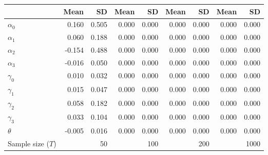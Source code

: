 
\begin{tabular}[t]{lrrrrrrrr}
\toprule
  & Mean & SD & Mean  & SD  & Mean   & SD   & Mean    & SD   \\
\midrule
$\alpha_{0}$ & 0.160 & 0.505 & 0.000 & 0.000 & 0.000 & 0.000 & 0.000 & 0.000\\
$\alpha_{1}$ & 0.060 & 0.188 & 0.000 & 0.000 & 0.000 & 0.000 & 0.000 & 0.000\\
$\alpha_{2}$ & -0.154 & 0.488 & 0.000 & 0.000 & 0.000 & 0.000 & 0.000 & 0.000\\
$\alpha_{3}$ & -0.016 & 0.050 & 0.000 & 0.000 & 0.000 & 0.000 & 0.000 & 0.000\\
$\gamma_{0}$ & 0.010 & 0.032 & 0.000 & 0.000 & 0.000 & 0.000 & 0.000 & 0.000\\
$\gamma_{1}$ & 0.015 & 0.047 & 0.000 & 0.000 & 0.000 & 0.000 & 0.000 & 0.000\\
$\gamma_{2}$ & 0.058 & 0.182 & 0.000 & 0.000 & 0.000 & 0.000 & 0.000 & 0.000\\
$\gamma_{3}$ & 0.033 & 0.104 & 0.000 & 0.000 & 0.000 & 0.000 & 0.000 & 0.000\\
$\theta$ & -0.005 & 0.016 & 0.000 & 0.000 & 0.000 & 0.000 & 0.000 & 0.000\\
Sample size ($T$) &  & 50 &  & 100 &  & 200 &  & 1000\\
\bottomrule
\end{tabular}
